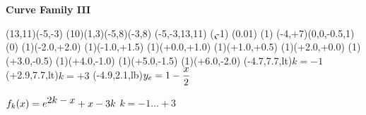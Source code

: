 \begin{center}
\newpage

{\huge \bf{Curve Family III}}
\bigskip

\begin{lapdf}(13,11)(-5,-3)
 \Lingrid(10)(1,3)(-5,8)(-3,8)
 \Rect(-5,-3,13,11)
 \Setclip
 \def\Fx(#1,#2){\Dset(\x,#1) \y=2\k \Sub(\y,\x)
  \Exp(\Np\y,#2) \Add(#2,\x) \y=3\k \Sub(#2,\y)}
 \Dset(\k,-1)
 \Setwidth(0.01)
 \Black
 \Dash(1)
 \Polynom(-4,+7)(0,0,-0.5,1) \Stroke
 \Dash(0)
 \Point(1)(-2.0,+2.0)
 \Point(1)(-1.0,+1.5)
 \Point(1)(+0.0,+1.0)
 \Point(1)(+1.0,+0.5)
 \Point(1)(+2.0,+0.0)
 \Point(1)(+3.0,-0.5)
 \Point(1)(+4.0,-1.0)
 \Point(1)(+5.0,-1.5)
 \Point(1)(+6.0,-2.0)
 \Text(-4.7,7.7,lt){$k=-1$}
 \Text(+2.9,7.7,lt){$k=+3$}
 \Text(-4.9,2.1,lb){$y_e=1-\displaystyle\frac{x}{2}$}
\end{lapdf}

$f_{k}(x)=e^{\displaystyle{2k-x}}+x-3k$ \qquad $k = -1 \dots +3$
\end{center}

